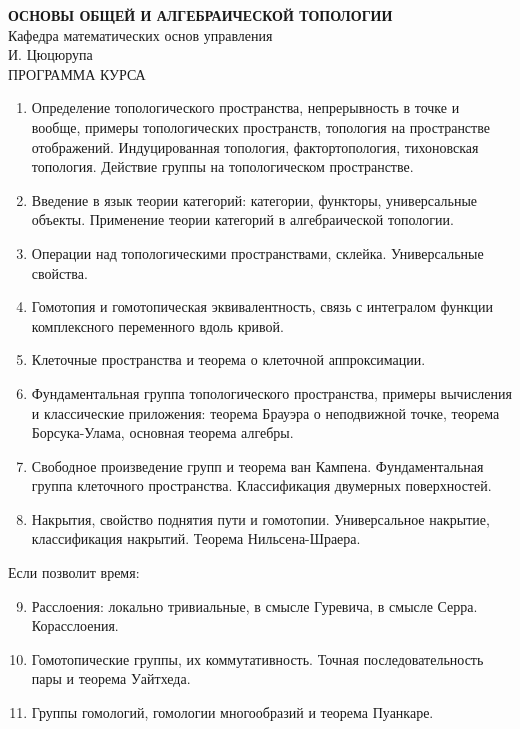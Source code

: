 \documentclass[12pt]{article}
\begin{document}
\pagestyle{empty}
\large{
\begin{center}
	\textbf{ОСНОВЫ ОБЩЕЙ И АЛГЕБРАИЧЕСКОЙ ТОПОЛОГИИ}\\
	Кафедра математических основ управления\\
	И. Цюцюрупа\\
	ПРОГРАММА КУРСА
\end{center}
}
\begin{enumerate}
	\item Определение топологического пространства, непрерывность в точке и вообще, примеры топологических пространств, топология на пространстве отображений. Индуцированная топология, фактортопология, тихоновская топология. Действие группы на топологическом пространстве. 
	\item Введение в язык теории категорий: категории, функторы, универсальные объекты. Применение теории категорий в алгебраической топологии.
	\item Операции над топологическими пространствами, склейка. Универсальные свойства.
	\item Гомотопия и гомотопическая эквивалентность, связь с интегралом функции комплексного переменного вдоль кривой.
	\item Клеточные пространства и теорема о клеточной аппроксимации.
	\item Фундаментальная группа топологического пространства, примеры вычисления и классические приложения: теорема Брауэра о неподвижной точке, теорема Борсука-Улама, основная теорема алгебры.
	\item Свободное произведение групп и теорема ван Кампена. Фундаментальная группа клеточного пространства. Классификация двумерных поверхностей.
	\item Накрытия, свойство поднятия пути и гомотопии. Универсальное накрытие, классификация накрытий. Теорема Нильсена-Шраера.
\end{enumerate}
Если позволит время:
\begin{enumerate}\setcounter{enumi}{8}
	\item Расслоения: локально тривиальные, в смысле Гуревича, в смысле Серра. Корасслоения.
	\item Гомотопические группы, их коммутативность. Точная последовательность пары и теорема Уайтхеда.
	\item Группы гомологий, гомологии многообразий и теорема Пуанкаре.
\end{enumerate}
\end{document}
